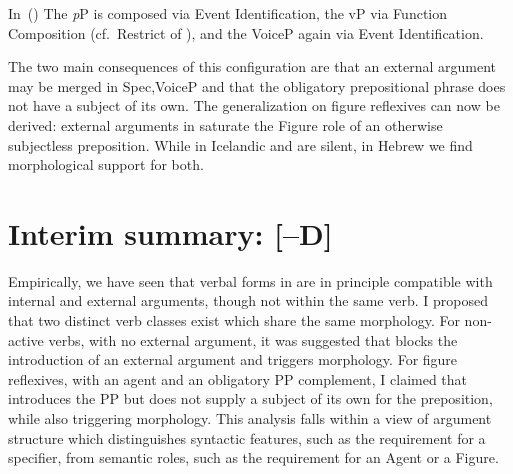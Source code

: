 In~(\lastx) The \emph{p}P is composed via Event Identification, the vP via Function Composition (cf.~Restrict of \citealt{chungladusaw04}), and the VoiceP again via Event Identification.


The two main consequences of this configuration are that an external argument may be merged in Spec,VoiceP and that the obligatory prepositional phrase does not have a subject of its own. The generalization on figure reflexives can now be derived: external arguments in {\tnif} saturate the Figure role of an otherwise subjectless preposition. While in Icelandic {\vz} and {\pz} are silent, in Hebrew we find morphological support for both.


	\section{Interim summary: [--D]} \label{vz:intersum}
Empirically, we have seen that verbal forms in {\tnif} are in principle compatible with internal and external arguments, though not within the same verb. I proposed that two distinct verb classes exist which share the same morphology. For non-active verbs, with no external argument, it was suggested that {\vz} blocks the introduction of an external argument and triggers {\tnif} morphology. For figure reflexives, with an agent and an obligatory PP complement, I claimed that {\pz} introduces the PP but does not supply a subject of its own for the preposition, while also triggering {\tnif} morphology. This analysis falls within a view of argument structure which distinguishes syntactic features, such as the requirement for a specifier, from semantic roles, such as the requirement for an Agent or a Figure.

